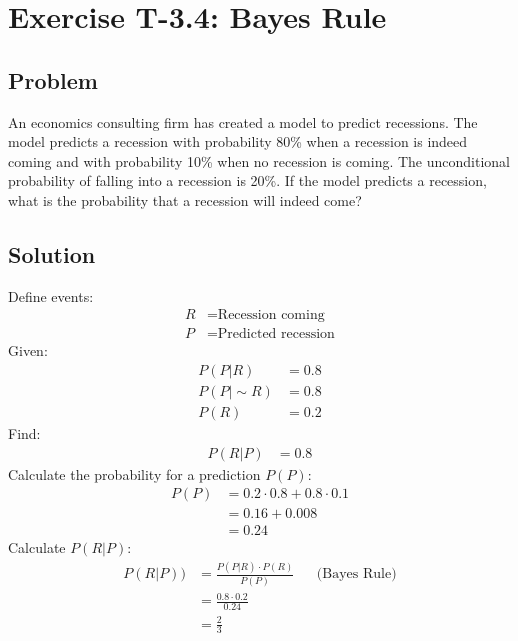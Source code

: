 \section*{Exercise T-3.4: Bayes Rule}

\subsection*{Problem}

An economics consulting firm has created a model to predict recessions. The model predicts a recession with probability 80\% when a recession is indeed coming and with probability 10\% when no recession is coming. The unconditional probability of falling into a recession is 20\%. If the model predicts a recession, what is the probability that a recession will indeed come?

\subsection*{Solution}
Define events:
\begin{align}
	R &= \text{Recession coming}\nonumber \\
	P &= \text{Predicted recession}\nonumber
\end{align}
Given:
\begin{align}
	P(P|R) &= 0.8 \nonumber \\
	P(P|\sim R) &= 0.8 \nonumber \\
	P(R) &= 0.2 \nonumber
\end{align}
Find:
\begin{align}
	P(R|P) &= 0.8 \nonumber
\end{align}
Calculate the probability for a prediction $P(P)$:
\begin{align}
	P(P) &= 0.2 \cdot 0.8 + 0.8 \cdot 0.1 \nonumber \\
	&= 0.16 + 0.008 \nonumber \\
	&= 0.24 \nonumber 
\end{align}
Calculate $P(R|P)$:
\begin{align}
	P(R|P)) &= \frac{P(P|R) \cdot  P(R)}{P(P)} && \text{(Bayes Rule)} \nonumber \\
	&= \frac{0.8 \cdot 0.2}{0.24} \nonumber \\
	&= \frac{2}{3} \nonumber
\end{align}
